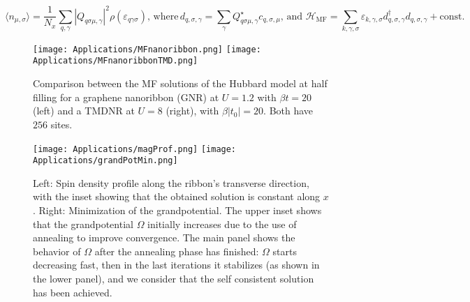 \begin{equation}
\big\langle n_{\mu, \sigma} \big\rangle = \frac{1}{N_x}\sum_{q, \gamma} | Q_{q \sigma \mu, \gamma} |^2 \rho ( \varepsilon_{q \gamma \sigma} ) , \, \text{where} \, d_{q, \sigma, \gamma} = \sum_\gamma Q_{q \sigma \mu, \gamma}^\star c_{q ,\sigma, \mu} ,  \, \text{and} \,\, \mathcal{H}_{\text{MF}} = \sum_{k, \gamma, \sigma} \varepsilon_{k, \gamma, \sigma} d_{q, \sigma, \gamma}^\dagger d_{q, \sigma, \gamma} + \text{const.}
\end{equation}

\begin{figure}[H]
\texttt{[image: Applications/MFnanoribbon.png]}
\hspace{-0.18cm}
\texttt{[image: Applications/MFnanoribbonTMD.png]}
	\caption[Comparison between the MF solutions of the Hubbard model for a graphene nanoribbon (GNR) and a \acs{TMDNR}]{Comparison between the MF solutions of the Hubbard model at half filling for a graphene nanoribbon (GNR) at $U=1.2$ with $\beta t = 20$ (left) and a \acs{TMDNR} at $U=8$ (right), with $\beta | t_0 | = 20$.
	Both have $256$ sites.}
	\label{fig:nanoGraphVsTMD}
\end{figure}

\begin{figure}[H]
\texttt{[image: Applications/magProf.png]}
\texttt{[image: Applications/grandPotMin.png]}
	\caption[Spin density profile along the ribbon's transverse direction. Minimization of the grandpotential.]{Left: Spin density profile along the ribbon's transverse direction, with the inset showing that the obtained solution is constant along $x$. Right: Minimization of the grandpotential. 
	The upper inset shows that the grandpotential $\Omega$ initially increases due to the use of annealing to improve convergence. The main panel shows the behavior of $\Omega$ after the annealing phase has finished:
	$\Omega$ starts decreasing fast, then in the last iterations it stabilizes (as shown in the lower panel), and we consider that the self consistent solution has been achieved.}
	\label{fig:densSpinGrandPot}
\end{figure}

